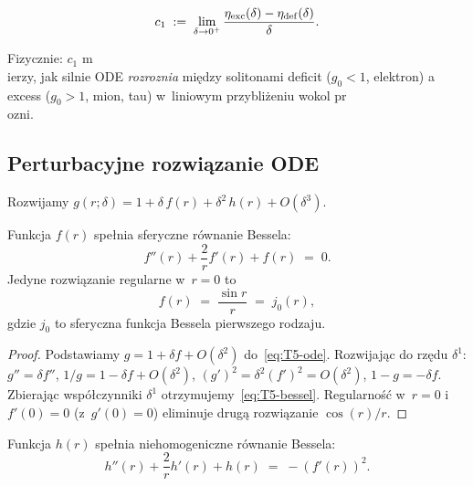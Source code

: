 \begin{definition}\label{def:T5-c1}
\begin{equation}\label{eq:T5-c1-def}
  c_1 \;:=\; \lim_{\delta \to 0^+} \frac{\eta_{\rm exc}(\delta) - \eta_{\rm def}(\delta)}{\delta}.
\end{equation}
\end{definition}

Fizycznie: $c_1$ m\\ierzy, jak silnie ODE \emph{rozrozni{a}} mi\k{e}dzy
solitonami deficit ($g_0 < 1$, elektron) a excess ($g_0 > 1$, mion, tau)
w~liniowym przybli\.zeniu wokol pr\\ozni.

\subsection{Perturbacyjne rozwi\k{a}zanie ODE}
\label{app:T5-perturbation}

Rozwijamy $g(r;\delta) = 1 + \delta\, f(r) + \delta^2\, h(r) + O(\delta^3)$.

\begin{lemma}[Rz\k{a}d liniowy]\label{lem:T5-linear}
Funkcja $f(r)$ spe\l{}nia sferyczne r\'ownanie Bessela:
\begin{equation}\label{eq:T5-bessel}
  f''(r) + \frac{2}{r} f'(r) + f(r) \;=\; 0.
\end{equation}
Jedyne rozwi\k{a}zanie regularne w~$r=0$ to
\begin{equation}\label{eq:T5-f}
  f(r) \;=\; \frac{\sin r}{r} \;=\; j_0(r),
\end{equation}
gdzie $j_0$ to sferyczna funkcja Bessela pierwszego rodzaju.
\end{lemma}

\begin{proof}
Podstawiamy $g = 1 + \delta f + O(\delta^2)$ do~\eqref{eq:T5-ode}.
Rozwijaj\k{a}c do rz\k{e}du $\delta^1$:
$g'' = \delta f''$, $1/g = 1 - \delta f + O(\delta^2)$,
$(g')^2 = \delta^2 (f')^2 = O(\delta^2)$, $1 - g = -\delta f$.
Zbieraj\k{a}c wsp\'o\l{}czynniki $\delta^1$ otrzymujemy~\eqref{eq:T5-bessel}.
Regularno\'s\'c w~$r=0$ i~$f'(0) = 0$ (z~$g'(0)=0$) eliminuje
drug\k{a} rozwi\k{a}zanie $\cos(r)/r$.
\end{proof}

\begin{lemma}[Rz\k{a}d kwadratowy]\label{lem:T5-quadratic}
Funkcja $h(r)$ spe\l{}nia niehomogeniczne r\'ownanie Bessela:
\begin{equation}\label{eq:T5-h-eq}
  h''(r) + \frac{2}{r} h'(r) + h(r) \;=\; -(f'(r))^2.
\end{equation}
\end{lemma}

